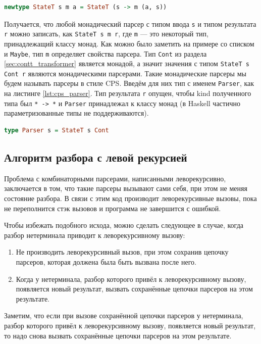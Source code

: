 \documentclass[times]{itmo-student-thesis}
\begin{document}
\begin{lstlisting}[language=Haskell,float=!h,caption={StateT трансформер монад},label={lst:stetet}]
  newtype StateT s m a = StateT (s -> m (a, s))
\end{lstlisting}

Получается, что любой монадический парсер с типом ввода \lstinline{s} и типом результата \lstinline{r} можно
записать, как \lstinline{StateT s m r}, где \lstinline{m} --- это некоторый тип, принадлежащий классу монад. Как можно 
было заметить на примере со списком и \lstinline{Maybe}, тип \lstinline{m} определяет свойства парсера. 
Тип \lstinline{Cont} из раздела \ref{sec:contt_transformer} является монадой, а значит значения с типом
\lstinline{StateT s Cont r} являются монадическими парсерами. Такие монадические парсеры мы будем называть парсеры
в стиле CPS. Введём для них тип с именем \lstinline{Parser}, как на листинге \ref{lst:cps_parser}. Тип результата
\lstinline{r} опущен, чтобы kind полученного типа был \lstinline{* -> *} и \lstinline{Parser} принадлежал к
классу монад (в Haskell частично параметризованные типы не поддерживаются).

\begin{lstlisting}[language=Haskell,float=!h,caption={Парсер в CPS стиле},label={lst:cps_parser}]
  type Parser s = StateT s Cont
\end{lstlisting}

\subsection{Алгоритм разбора с левой рекурсией}\label{sec:memoized_cps_parser}

Проблема с комбинаторными парсерами, написанными леворекурсивно, заключается в том, что такие парсеры вызывают сами
себя, при этом не меняя состояние разбора. В связи с этим код производит леворекурсивные вызовы, пока не переполнится стэк 
вызовов и программа не завершится с ошибкой.

Чтобы избежать подобного исхода, можно сделать следующее в случае, когда разбор нетерминала приводит к леворекурсивному вызову:
\begin{enumerate}
    \item Не производить леворекурсивный вызов, при этом сохранив цепочку парсеров, которая должена была быть вызвана после него.
    \item Когда у нетерминала, разбор которого привёл к леворекурсивному вызову, появляется новый результат, вызвать сохранённые цепочки парсеров
          на этом результате.
\end{enumerate}
Заметим, что если при вызове сохранённой цепочки парсеров у нетерминала, разбор которого привёл к леворекурсивному вызову,
появляется новый результат, то надо снова вызвать сохранённые цепочки парсеров на этом результате. 
\end{document}
